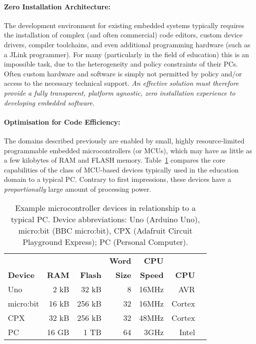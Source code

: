 \paragraph{Zero Installation Architecture:}
The development environment for existing embedded systems typically requires the installation of complex (and often commercial) code editors, custom device drivers, compiler toolchains, and even additional programming hardware (such as a JLink programmer). For many (particularly in the field of education) this is an impossible task, due to the heterogeneity and policy constraints of their PCs. Often custom hardware and software is simply not permitted by policy and/or access to the necessary technical support. \emph{An effective solution must therefore provide a fully transparent, platform agnostic, zero installation experience to developing embedded software}.

\paragraph{Optimisation for Code Efficiency:}
The domains described previously are enabled by small, highly resource-limited programmable embedded microcontrollers (or MCUs), which may have as little as a few kilobytes of RAM and FLASH memory.
Table~\ref{table:devices} compares the core capabilities of the class of MCU-based devices typically used in the education domain to a typical PC. Contrary to first impressions, these devices have a \emph{proportionally} large amount of processing power.

\begin{table}[t]
    \centering
    \begin{tabular}{|l|r|r|r|r|r|r|}
    \hline
                           &          &              & \bf{Word}  & \bf{CPU} &            \\
    \bf{Device}            & \bf{RAM} & \bf{Flash}   & \bf{Size}  & \bf{Speed} & \bf{CPU}  \\ \hline
    Uno            & 2 kB       & 32 kB      & 8          & 16MHz & AVR       \\ \hline
    micro:bit          & 16 kB      & 256 kB     & 32         & 16MHz & Cortex     \\ \hline
    CPX           & 32 kB      & 256 kB     & 32         & 48MHz & Cortex    \\ \hline
    PC             & 16 GB      & 1 TB       & 64         & 3GHz & Intel      \\ \hline
    \end{tabular}
    \setlength{\textfloatsep}{-10pt}
    \caption{\label{table:devices}Example microcontroller devices in relationship to a typical PC. Device abbreviations: Uno (Arduino Uno), micro:bit (BBC micro:bit), CPX (Adafruit Circuit Playground Express); PC (Personal Computer).}
    \vspace{-20pt}
\end{table}

